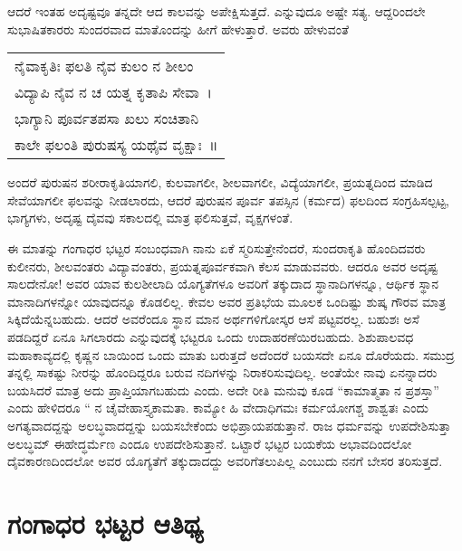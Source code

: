 {ಆದರೆ ಇಂತಹ ಅದೃಷ್ಟವೂ ತನ್ನದೇ ಆದ ಕಾಲವನ್ನು ಅಪೇಕ್ಷಿಸುತ್ತದೆ. ಎನ್ನುವುದೂ ಅಷ್ಟೇ ಸತ್ಯ. ಆದ್ದರಿಂದಲೇ ಸುಭಾಷಿತಕಾರರು ಸುಂದರವಾದ ಮಾತೊಂದನ್ನು ಹೀಗೆ ಹೇಳುತ್ತಾರೆ. ಅವರು ಹೇಳುವಂತೆ   \enginline{--}  
\vskip 2pt

\begin{tabular}{>{\hspace{0.8cm}}l}
ನೈವಾಕೃತಿಃ ಫಲತಿ ನೈವ ಕುಲಂ ನ ಶೀಲಂ \\ವಿದ್ಯಾಪಿ ನೈವ ನ ಚ ಯತ್ನ ಕೃತಾಪಿ ಸೇವಾ~।\\
ಭಾಗ್ಯಾನಿ ಪೂರ್ವತಪಸಾ ಖಲು ಸಂಚಿತಾನಿ \\ಕಾಲೇ ಫಲಂತಿ ಪುರುಷಸ್ಯ ಯಥೈವ ವೃಕ್ಷಾಃ~॥
\end{tabular}
\vskip 2pt

\noindent
ಅಂದರೆ ಪುರುಷನ ಶರೀರಾಕೃತಿಯಾಗಲಿ, ಕುಲವಾಗಲೀ, ಶೀಲವಾಗಲೀ, ವಿದ್ಯೆಯಾಗಲೀ, ಪ್ರಯತ್ನದಿಂದ ಮಾಡಿದ ಸೇವೆಯಾಗಲೀ ಫಲವನ್ನು ನೀಡಲಾರದು, ಆದರೆ ಪುರುಷನ ಪೂರ್ವ ತಪಸ್ಸಿನ (ಕರ್ಮದ) ಫಲದಿಂದ ಸಂಗ್ರಹಿಸಲ್ಪಟ್ಟ, ಭಾಗ್ಯಗಳು, ಅದೃಷ್ಟ ದೈವವು ಸಕಾಲದಲ್ಲಿ ಮಾತ್ರ ಫಲಿಸುತ್ತವೆ, ವೃಕ್ಷಗಳಂತೆ. 

ಈ ಮಾತನ್ನು ಗಂಗಾಧರ ಭಟ್ಟರ ಸಂಬಂಧವಾಗಿ ನಾನು ಏಕೆ ಸ್ಮರಿಸುತ್ತೇನೆಂದರೆ, ಸುಂದರಾಕೃತಿ ಹೊಂದಿದವರು ಕುಲೀನರು, ಶೀಲವಂತರು ವಿದ್ಯಾವಂತರು, ಪ್ರಯತ್ನಪೂರ್ವಕವಾಗಿ ಕೆಲಸ ಮಾಡುವವರು. ಆದರೂ ಅವರ ಅದೃಷ್ಟ ಸಾಲದೇನೋ! ಅವರ ಯಾವ ಕುಲಶೀಲಾದಿ ಯೊಗ್ಯತೆಗಳೂ ಅವರಿಗೆ ತಕ್ಕುದಾದ ಸ್ಥಾನಾದಿಗಳನ್ನೂ, ಆರ್ಥಿಕ ಸ್ಥಾನ ಮಾನಾದಿಗಳನ್ನೋ ಯಾವುದನ್ನೂ ಕೊಡಲಿಲ್ಲ. ಕೇವಲ ಅವರ ಪ್ರ‍ತಿಭೆಯ ಮೂಲಕ ಒಂದಿಷ್ಟು ಶುಷ್ಕ ಗೌರವ ಮಾತ್ರ ಸಿಕ್ಕಿದೆಯೆನ್ನಬಹುದು. ಆದರೆ ಅವರೆಂದೂ ಸ್ಥಾನ ಮಾನ ಅರ್ಥಗಳಿಗೋಸ್ಕರ ಆಸೆ ಪಟ್ಟವರಲ್ಲ. ಬಹುಶಃ ಅಸೆ ಪಡದಿದ್ದರೆ ಏನೂ ಸಿಗಲಾರದು ಎನ್ನುವುದಕ್ಕೆ ಭಟ್ಟರೂ ಒಂದು ಉದಾಹರಣೆಯಿರಬಹುದು. ಶಿಶುಪಾಲವಧ ಮಹಾಕಾವ್ಯದಲ್ಲಿ ಕೃಷ್ಣನ ಬಾಯಿಂದ ಒಂದು ಮಾತು ಬರುತ್ತದೆ ಅದೆಂದರೆ ಬಯಸದೇ ಏನೂ ದೊರೆಯದು. ಸಮುದ್ರ ತನ್ನಲ್ಲಿ ಸಾಕಷ್ಟು ನೀರನ್ನು ಹೊಂದಿದ್ದರೂ ಬರುವ ನದಿಗಳನ್ನು ನಿರಾಕರಿಸುವುದಿಲ್ಲ. ಅಂತೆಯೇ ನಾವು ಏನನ್ನಾದರು ಬಯಸಿದರೆ ಮಾತ್ರ ಅದು ಪ್ರಾಪ್ತಿಯಾಗಬಹುದು ಎಂದು. ಅದೇ ರೀತಿ ಮನುವು ಕೂಡ “ಕಾಮಾತ್ಮತಾ ನ ಪ್ರಶಸ್ತಾ” ಎಂದು ಹೇಳಿದರೂ “ ನ ಚೈವೇಹಾಸ್ತ್ಯಕಾಮತಾ. ಕಾಮ್ಯೋ ಹಿ ವೇದಾಧಿಗಮಃ ಕರ್ಮಯೋಗಶ್ಚ ಶಾಶ್ವತಃ ಎಂದು ಅಗತ್ಯವಾದದ್ದನ್ನು ಅಲಬ್ಧವಾದದ್ದನ್ನು ಬಯಸ\-ಬೇಕೆಂದು ಅಭಿಪ್ರಾಯಪಡುತ್ತಾನೆ. ರಾಜ ಧರ್ಮವನ್ನು ಉಪದೇಶಿಸುತ್ತಾ ಅಲಬ್ಧಮ್ ಈಹೇದ್ಧರ್ಮೆಣ ಎಂದೂ ಉಪದೇಶಿಸುತ್ತಾನೆ. ಒಟ್ಟಾರೆ ಭಟ್ಟರ ಬಯಕೆಯ ಅಭಾವ\break ದಿಂದಲೋ ದೈವಕಾರಣದಿಂದಲೋ ಅವರ ಯೊಗ್ಯತೆಗೆ ತಕ್ಕುದಾದದ್ದು ಅವರಿಗೆ\break ತಲುಪಿಲ್ಲ ಎಂಬುದು ನನಗೆ ಬೇಸರ ತರಿಸುತ್ತದೆ.

\section*{ಗಂಗಾಧರ ಭಟ್ಟರ ಆತಿಥ್ಯ}

}
